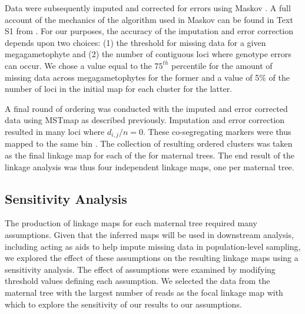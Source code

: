 \documentclass[11pt]{article}
\begin{document}
Data were subsequently imputed and corrected for errors using Maskov \citep{Ward:2013}. A full account of the mechanics of the algorithm
used in Maskov can be found in Text S1 from \citet{Ward:2013}. For our purposes, the accuracy of the imputation and
error correction depends upon two choices: (1) the threshold for missing data for a given megagametophyte and (2) the number of 
contiguous loci where genotype errors can occur. We chose a value equal to the $75^{th}$ percentile for the amount of 
missing data across megagametophytes for the former and a value of 5\% of the number of loci in the initial map for each
cluster for the latter.

A final round of ordering was conducted with the imputed and error corrected data using MSTmap as described previously. Imputation 
and error correction resulted in many loci where $d_{i,j}/n = 0$. These co-segregating markers were thus mapped to the same bin
\citep[see][]{Wu:2008a}. The collection of resulting ordered clusters was taken as the final linkage map for each of the for maternal trees. 
The end result of the linkage analysis was thus four independent linkage maps, one per maternal tree.

\subsection*{Sensitivity Analysis}
The production of linkage maps for each maternal tree required many assumptions.
Given that the inferred maps will be used in downstream analysis, including acting as aids
to help impute missing data in population-level sampling, we explored the effect of these assumptions on 
the resulting linkage maps using a sensitivity analysis. The effect of assumptions 
were examined by modifying threshold values defining each assumption. We selected the
data from the maternal tree with the largest number of reads as the focal linkage map with which to explore
the sensitivity of our results to our assumptions.
\end{document}
